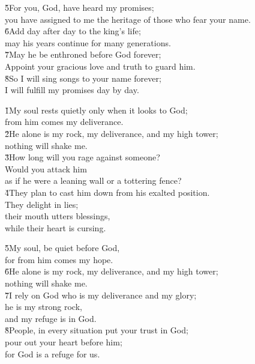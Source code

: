 \begin{poetry}
\poeml \v{5}For you, God, have heard my promises; \\
\poemll    you have assigned to me the heritage of those who fear your name. \\
\poeml \v{6}Add day after day to the king's life; \\
\poemll    may his years continue for many generations. \\
\poeml \v{7}May he be enthroned before God forever; \\
\poemll    Appoint your gracious love and truth to guard him. \\
\poeml \v{8}So I will sing songs to your name forever; \\
\poemll    I will fulfill my promises day by day.
\end{poetry}

\begin{poetry}
\poeml \v{1}My soul rests quietly only when it looks to God; \\
\poemll    from him comes my deliverance. \\
\poeml \v{2}He alone is my rock, my deliverance, and my high tower; \\
\poemll    nothing will shake me. \\
\poeml \v{3}How long will you rage against someone? \\
\poemll    Would you attack him \\
\poemlll       as if he were a leaning wall or a tottering fence? \\
\poeml \v{4}They plan to cast him down from his exalted position. \\
\poemll    They delight in lies; \\
\poeml their mouth utters blessings, \\
\poemll    while their heart is cursing.
\end{poetry}

\begin{poetry}
\poeml \v{5}My soul, be quiet before God, \\
\poemll    for from him comes my hope. \\
\poeml \v{6}He alone is my rock, my deliverance, and my high tower; \\
\poemll    nothing will shake me. \\
\poeml \v{7}I rely on God who is my deliverance and my glory; \\
\poemll    he is my strong rock, \\
\poemlll       and my refuge is in God. \\
\poeml \v{8}People, in every situation put your trust in God; \\
\poemll    pour out your heart before him; \\
\poemlll       for God is a refuge for us.
\end{poetry}


